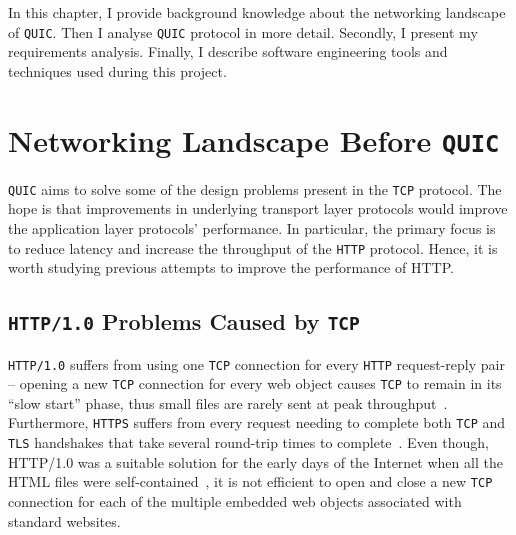 \documentclass[12pt,a4paper]{report}
\begin{document}


In this chapter, I provide background knowledge about the networking landscape of \texttt{QUIC}. 
Then I analyse \texttt{QUIC} protocol in more detail.
Secondly, I present my requirements analysis.
Finally, I describe software engineering tools and techniques used during this project.


\section{Networking Landscape Before \texttt{QUIC}} \label{Networking_Landscape_Before_QUIC}
    \texttt{QUIC} aims to solve some of the design problems present in the \texttt{TCP} protocol. The hope is that improvements in underlying transport layer protocols would improve the application layer protocols' performance.
    In particular, the primary focus is to reduce latency and increase the throughput of the \texttt{HTTP} protocol.
    Hence, it is worth studying previous attempts to improve the performance of HTTP.


\subsection{\texttt{HTTP/1.0} Problems Caused by \texttt{TCP}}
    \texttt{HTTP/1.0} suffers from using one \texttt{TCP} connection for every \texttt{HTTP} request-reply pair \cite{TCP_IP_Guide_Book, HTTP_3_the_past_the_present_and_the_future} --
    opening a new \texttt{TCP} connection for every web object causes \texttt{TCP} to remain in its \enquote{slow start} phase, thus small files are rarely sent at peak throughput~\cite{HTTP_3_the_past_the_present_and_the_future}.
    Furthermore, \texttt{HTTPS} suffers from every request needing to complete both \texttt{TCP} and \texttt{TLS} handshakes that take several round-trip times to complete~\cite{HTTP_3_the_past_the_present_and_the_future}.
    Even though, HTTP/1.0 was a suitable solution for the early days of the Internet when all the HTML files were self-contained~\cite{TCP_IP_Guide_Book_2}, it is not efficient to open and close a new \texttt{TCP} connection for each of the multiple embedded web objects associated with standard websites.
\end{document}
